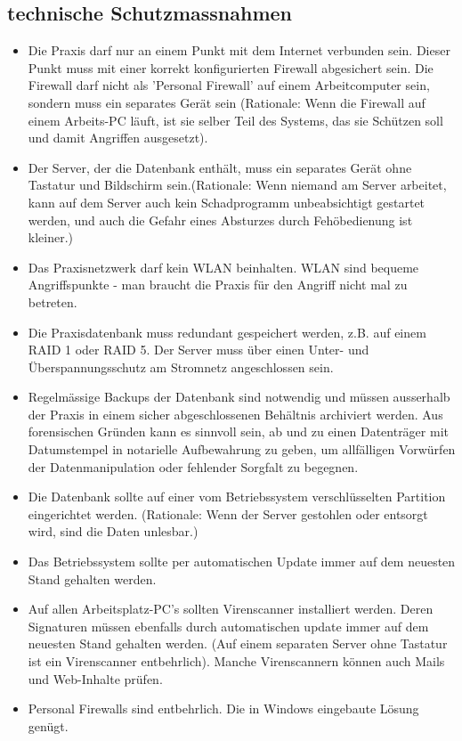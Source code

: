 \documentclass[a4paper]{scrartcl}
\begin{document}
\subsection{technische Schutzmassnahmen}
\begin{itemize}
\item Die Praxis darf nur an einem Punkt mit dem Internet verbunden sein. Dieser Punkt muss mit einer korrekt konfigurierten Firewall abgesichert sein. Die Firewall darf nicht als 'Personal Firewall' auf einem Arbeitcomputer sein, sondern muss ein separates Gerät sein (Rationale: Wenn die Firewall auf einem Arbeits-PC läuft, ist sie selber Teil des Systems, das sie Schützen soll und damit Angriffen ausgesetzt).

\item Der Server, der die Datenbank enthält, muss ein separates Gerät ohne Tastatur und Bildschirm sein.(Rationale: Wenn niemand am Server arbeitet, kann auf dem Server auch kein Schadprogramm unbeabsichtigt gestartet werden, und auch die Gefahr eines Absturzes durch Fehöbedienung ist kleiner.)

\item Das Praxisnetzwerk darf kein WLAN beinhalten. WLAN sind bequeme Angriffspunkte - man braucht die Praxis für den Angriff nicht mal zu betreten.

\item Die Praxisdatenbank muss redundant gespeichert werden, z.B. auf einem RAID 1 oder RAID 5. Der Server muss über einen Unter- und Überspannungsschutz am Stromnetz angeschlossen sein.

\item Regelmässige Backups der Datenbank sind notwendig und müssen ausserhalb der Praxis in einem sicher abgeschlossenen Behältnis  archiviert werden. Aus forensischen Gründen kann es sinnvoll sein, ab und zu einen Datenträger mit Datumstempel in notarielle Aufbewahrung zu geben, um allfälligen Vorwürfen der Datenmanipulation oder fehlender Sorgfalt zu begegnen.

\item Die Datenbank sollte auf einer vom Betriebssystem verschlüsselten Partition eingerichtet werden. (Rationale: Wenn der Server gestohlen oder entsorgt wird, sind die Daten unlesbar.)

\item Das Betriebssystem sollte per automatischen Update immer auf dem neuesten Stand gehalten werden.

\item Auf allen Arbeitsplatz-PC's sollten Virenscanner installiert werden. Deren Signaturen müssen ebenfalls durch automatischen update immer auf dem neuesten Stand gehalten werden. (Auf einem separaten Server ohne Tastatur ist ein Virenscanner entbehrlich). Manche Virenscannern können auch Mails und Web-Inhalte prüfen.

\item Personal Firewalls sind entbehrlich. Die in Windows eingebaute Lösung genügt.

\end{itemize}
\end{document}
